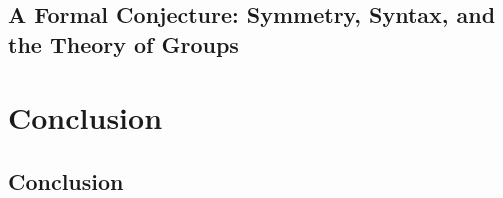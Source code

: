 \documentclass[11pt]{book}%
\theoremstyle{plain}
\numberwithin{equation}{section}
\theoremstyle{definition}
\newtheorem{phrase string}{Phrase String}
\begin{document}
\chapter[Formal Conjecture]{A Formal Conjecture: Symmetry, Syntax, and the Theory of Groups}\label{nontrivialsymmetry}%







\part{Conclusion}%
\chapter{Conclusion}%








\printindex
\end{document}

